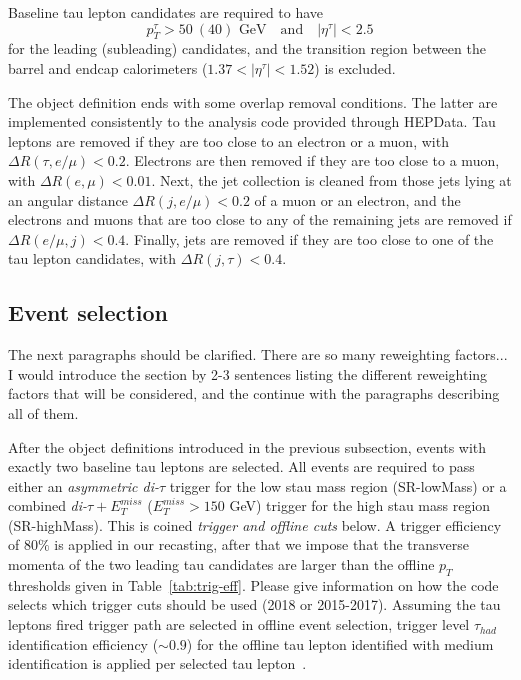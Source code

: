 \documentclass{ws-mpla}
\begin{document}
Baseline tau lepton candidates are required to have 
\begin{equation}
p^{\tau}_T > 50\ (40) \textrm{ GeV}\quad \textrm{and}\quad |\eta^{\tau}| < 2.5
\end{equation}
for the leading (subleading) candidates, and the transition region between the barrel and endcap calorimeters ($ 1.37 < |\eta^{\tau}| < 1.52 $) is excluded.

The object definition ends with some overlap removal conditions. The latter are implemented consistently to the analysis code provided through HEPData\cite{hepdata}.
Tau leptons are removed if they are too close to an electron or a muon, with $\Delta R(\tau,e/\mu) < 0.2$. Electrons are then removed if they are too close to a muon, with $\Delta R(e,\mu) < 0.01$. Next, the jet collection is cleaned from those jets lying at an angular distance $\Delta R(j,e/\mu) < 0.2$ of a muon or an electron, and the electrons and muons that are too close to any of the remaining jets are removed if $\Delta R(e/\mu,j) < 0.4$. Finally, jets are removed if they are too close to one of the tau lepton candidates, with $\Delta R(j,\tau) < 0.4$.


\subsection{Event selection}\label{sec:selection}
{\color{red}The next paragraphs should be clarified. There are so many reweighting factors... I would introduce the section by 2-3 sentences listing the different reweighting factors that will be considered, and the continue with the paragraphs describing all of them.}

After the object definitions introduced in the previous subsection, events with exactly two baseline tau leptons are selected.
All events are required to pass either an \textit{asymmetric di-$\tau$} trigger for the low stau mass region (SR-lowMass) or a combined \textit{di-$\tau +E^{miss}_T$} ($E^{miss}_T > 150$ GeV) trigger for the high stau mass region (SR-highMass). This is coined \textit{trigger and offline cuts} below.
A trigger efficiency of $80\%$ is applied in our recasting, after that we impose that the transverse momenta of the two leading tau candidates are larger than the offline $p_T$ thresholds given in Table~\ref{tab:trig-eff}. {\color{red}Please give information on how the code selects which trigger cuts should be used (2018 or 2015-2017).}
Assuming the tau leptons fired trigger path are selected in offline event selection, trigger level $\tau_{had}$ identification efficiency ($\sim 0.9$) for the offline tau lepton identified with medium identification is applied per selected tau lepton~\cite{ATLAS:2017mpa}.
\end{document}

